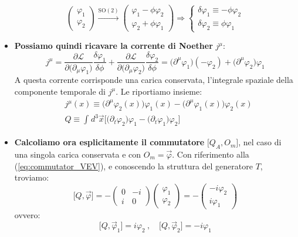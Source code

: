\documentclass[../main.tex]{subfiles}
\begin{document}
\begin{exercise}
\begin{itemize}
    \[
    \begin{pmatrix}
    \varphi_1\\ 
    \varphi_2
    \end{pmatrix}\xrightarrow{\textrm{SO}(2)}
    \begin{pmatrix}
    \varphi_1 - \phi\varphi_2\\ 
    \varphi_2 + \phi\varphi_1
    \end{pmatrix} \Rightarrow 
    \boxed{\begin{cases}
        \delta\varphi_1 \equiv -\phi\varphi_2\\
        \delta\varphi_2 \equiv \phi\varphi_1
    \end{cases}}
    \]
    \item \textbf{Possiamo quindi ricavare la corrente di Noether} $j^\mu$:
    \[
    j^\mu = \frac{\partial\mathscr{L}}{\partial\big(\partial_\mu\varphi_1\big)}\frac{\delta\varphi_1
    }{\delta\phi} +\frac{\partial\mathscr{L}}{\partial\big(\partial_\mu\varphi_2\big)}\frac{\delta\varphi_2
    }{\delta\phi}= \big(\partial^\mu\varphi_1\big)(-\varphi_2) + \big(\partial^\mu\varphi_2\big)\varphi_1
    \]
    A questa corrente corrisponde una carica conservata, l'integrale spaziale della componente temporale di $j^\mu$. Le riportiamo insieme:
    \begin{equation}
        \boxed{
        \begin{aligned}
        &j^\mu(x) \equiv
        \big(\partial^\mu\varphi_2(x)\big)\varphi_1(x) -\big(\partial^\mu\varphi_1(x)\big)\varphi_2(x)\\
        &Q \equiv \int_{}d^3\Vec{x}\big[\big(\partial_t\varphi_2\big)\varphi_1 - \big(\partial_t\varphi_1\big)\varphi_2\big]
        \end{aligned}}
        \label{eq:U1_noether_current_and_charge}
    \end{equation}

    \item \textbf{Calcoliamo ora esplicitamente il commutatore} $\big[Q_A, O_m\big]$, nel caso di una singola carica conservata e con $O_m= \Vec{\varphi}$. Con riferimento alla (\ref{eq:commutator_VEV}), e conoscendo la struttura del generatore $T$, troviamo:
    \[
    \big[Q, \Vec{\varphi}\big] = -
    \begin{pmatrix}
    0&-i\\ 
    i&0
    \end{pmatrix}
    \begin{pmatrix}
    \varphi_1\\ 
    \varphi_2
    \end{pmatrix} = -\begin{pmatrix}
    -i\varphi_2\\ 
    i\varphi_1
    \end{pmatrix}
    \]
    ovvero:
    \begin{equation}
        \boxed{\big[Q, \Vec{\varphi}_1\big] = i\varphi_2~,\quad \big[Q, \Vec{\varphi}_2\big] = -i\varphi_1}
        \label{eq:commutator_explicit_U1}
    \end{equation}
    

\end{itemize}
\end{exercise}
\end{document}
